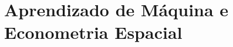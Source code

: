 \documentclass[12pt, a4paper, twoside, openright]{book}
\begin{document}
\part{Aprendizado de Máquina e Econometria Espacial}
















\backmatter




\printindex
\end{document}
